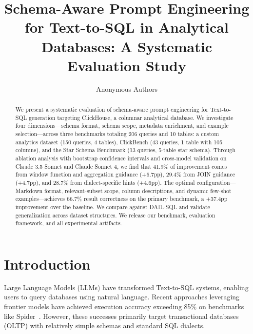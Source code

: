 \documentclass[sigconf, nonacm]{acmart}
\newcommand{\vldbTitle}[1]{\title{#1}}
\begin{document}
\vldbTitle{Schema-Aware Prompt Engineering for Text-to-SQL in Analytical Databases: A Systematic Evaluation Study}

\author{Anonymous Authors}

\begin{abstract}
We present a systematic evaluation of schema-aware prompt engineering for Text-to-SQL generation targeting ClickHouse, a columnar analytical database. We investigate four dimensions---schema format, schema scope, metadata enrichment, and example selection---across three benchmarks totaling 206 queries and 10 tables: a custom analytics dataset (150 queries, 4 tables), ClickBench (43 queries, 1 table with 105 columns), and the Star Schema Benchmark (13 queries, 5-table star schema). Through ablation analysis with bootstrap confidence intervals and cross-model validation on Claude 3.5 Sonnet and Claude Sonnet 4, we find that 41.9\% of improvement comes from window function and aggregation guidance (+6.7pp), 29.4\% from JOIN guidance (+4.7pp), and 28.7\% from dialect-specific hints (+4.6pp). The optimal configuration---Markdown format, relevant-subset scope, column descriptions, and dynamic few-shot examples---achieves 66.7\% result correctness on the primary benchmark, a +37.4pp improvement over the baseline. We compare against DAIL-SQL and validate generalization across dataset structures. We release our benchmark, evaluation framework, and all experimental artifacts.
\end{abstract}


\maketitle

\section{Introduction}
\label{sec:intro}

Large Language Models (LLMs) have transformed Text-to-SQL systems, enabling users to query databases using natural language. Recent approaches leveraging frontier models have achieved execution accuracy exceeding 85\% on benchmarks like Spider~\cite{yu2018spider}. However, these successes primarily target transactional databases (OLTP) with relatively simple schemas and standard SQL dialects.
\end{document}

